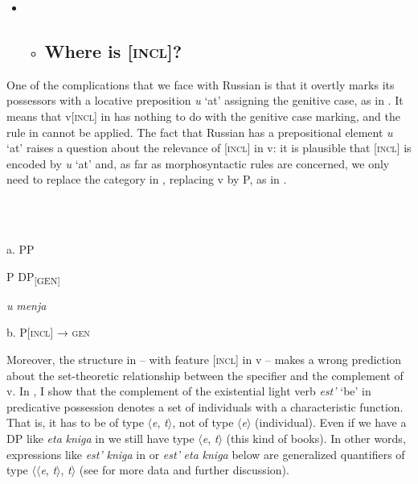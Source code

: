 \documentclass[output=paper,modfonts,nonflat]{langsci/langscibook}
\begin{document}
\begin{itemize}
\item \begin{itemize}
\item \subsection{Where is [\textsc{incl}]?}
\end{itemize}
\end{itemize}

One of the complications that we face with Russian is that it overtly marks its possessors with a locative preposition \textit{u} ‘at’ assigning the genitive case, as in . It means that v[\textsc{incl}] in  has nothing to do with the genitive case marking, and the rule in  cannot be applied. The fact that Russian has a prepositional element \textit{u} ‘at’ raises a question about the relevance of [\textsc{incl}] in v: it is plausible that [\textsc{incl}] is encoded by \textit{u} ‘at’ and, as far as morphosyntactic rules are concerned, we only need to replace the category in , replacing v by P, as in . 

\ea%
    \label{ex:key:8}
    \gll\\
        \\
    \glt
    \z

          a.  PP

    P  DP\textsubscript{[GEN]}

    \textit{u}      \textit{menja} 

  b.  P[\textsc{incl}] → \textsc{gen}

Moreover, the structure in  – with feature [\textsc{incl}] in v – makes a wrong prediction about the set-theoretic relationship between the specifier and the complement of v. In \citet{Tsedryk2019}, I show that the complement of the existential light verb \textit{est’} ‘be’ in predicative possession denotes a set of individuals with a characteristic function. That is, it has to be of type ${\langle}$\textit{e}, \textit{t}${\rangle}$, not of type ${\langle}$\textit{e}${\rangle}$ (individual). Even if we have a DP like \textit{eta} \textit{kniga} in  we still have type ${\langle}$\textit{e}, \textit{t}${\rangle}$ (this kind of books). In other words, expressions like \textit{est’} \textit{kniga} in  or \textit{est’} \textit{eta} \textit{kniga} below are generalized quantifiers of type ${\langle}{\langle}$\textit{e}, \textit{t}${\rangle}$, \textit{t}${\rangle}$ (see \citealt{Tsedryk2019} for more data and further discussion). 
\end{document}
